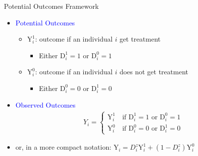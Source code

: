 \documentclass[dvipsnames,hyperref={pdfpagelabels=false}]{beamer}
\begin{document}
\begin{frame}{Potential Outcomes Framework}
	
	
	
	\begin{itemize}
		
		\item \textcolor{blue}{Potential Outcomes}
					\vspace{0.2cm}
		\begin{itemize}
			\item $\mathrm{Y}^{1}_{i}$: outcome if an individual $i$ get treatment 
					\vspace{0.2cm}
				\begin{itemize}	
			\item Either $\mathrm{D}^{1}_{i}=1$ or $\mathrm{D}^{0}_{i}=1$
			\vspace{0.2cm}
					\end{itemize}
			\item $\mathrm{Y}^{0}_{i}$: outcome if an individual $i$ does not get treatment 
			\vspace{0.2cm}
			\begin{itemize}	
			\item Either $\mathrm{D}^{0}_{i}=0$ or $\mathrm{D}^{1}_{i}=0$
								\end{itemize}
		\end{itemize}
		\vspace{0.2cm}
		\item \textcolor{blue}{Observed Outcomes}
		\begin{align*}
		Y_{i}=\left\lbrace
		\begin{array}{l}
		\mathrm{Y}^{1}_{i}\quad \text{if $\mathrm{D}^{1}_{i}=1$ or $\mathrm{D}^{0}_{i}=1$} \\
		\mathrm{Y}^{0}_{i}\quad \text{if $\mathrm{D}^{0}_{i}=0$ or $\mathrm{D}^{1}_{i}=0$}
		\end{array}\right.
		\end{align*}
		\item or, in a more compact notation: 
		$\mathrm{Y}_{i}=D^{z}_{i}\mathrm{Y}^{1}_{i}+(1-D^{z}_{i})\mathrm{Y}^{0}_{i} $
		
	\end{itemize}
\end{frame}
\end{document}
